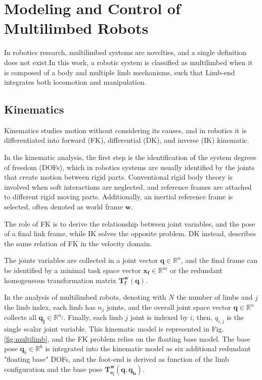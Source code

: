 \documentclass[11pt,a4paper,twocolumn]{article}
\begin{document}
\section{Modeling and Control of\\ Multilimbed Robots}
\label{sec:modeling_control_analysis}

In robotics research, multilimbed systems are novelties, and a single definition does not exist.In this work, a robotic system is classified as multilimbed when it is composed of a body and multiple limb mechanisms, such that Limb-end integrates both locomotion and manipulation\cite{Koyachi3}.

\subsection{Kinematics}
\label{subsec:kin}

Kinematics studies motion without considering its causes, and in robotics it is differentiated into forward (FK), differential (DK), and inverse (IK) kinematic.

In the kinematic analysis, the first step is the identification of the system degrees of freedom (DOFs), 
which in robotics systems are usually identified by the joints that create motion between rigid parts. Conventional rigid body theory is involved when soft interactions are neglected, and reference frames are attached to different rigid moving parts. Additionally, an inertial reference frame is selected, often denoted as world frame $\mathbf{w}$.

The role of FK is to derive the relationship between joint variables, and the pose of a final link frame\cite{Siciliano}, while IK solves the opposite problem. DK instead, describes the same relation of FK in the velocity domain. 


The joints variables are collected in a joint vector $\mathbf{q}\in \mathbb{R}^n$, and the final frame can be identified by a minimal task space vector $\mathbf{x_f} \in \mathbb{R}^m$ or the redundant homogeneous transformation matrix $\mathbf{T^w_f}(\mathbf{q})$.

In the analysis of multilimbed robots, denoting with $N$ the number of limbs and $j$ the limb index, each limb has $n_j$ joints, and the overall joint space vector $\mathbf{q}\in\mathbb{R}^n$ collects all $\mathbf{q_j}\in \mathbb{R}^{n_j}$. Finally, each limb $j$ joint is indexed by $i$, then, $q_{i,j}$ is the single scalar joint variable. This kinematic model is represented in Fig.\ref{fig:multilimb}, and the FK problem relies on the floating base model. The base pose $\mathbf{q}_b \in \mathbb{R}^6$ is integrated into the kinematic model as six additional redundant "floating base" DOFs, and the foot-end is derived as function of the limb configuration and the base pose $\mathbf{T^w_{e_j}}(\mathbf{q},\mathbf{q_b})$. 
\end{document}
